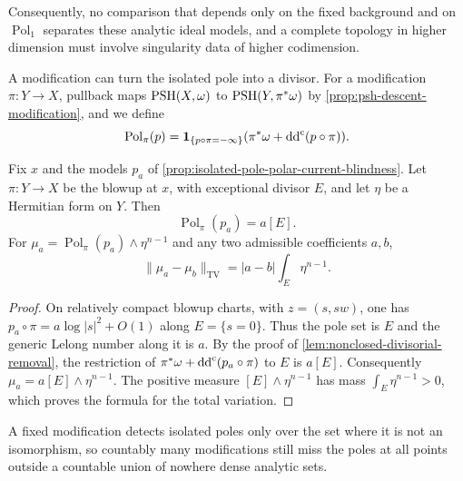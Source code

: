 Consequently, no comparison that depends only on the fixed background and on $\operatorname{Pol}_1$ separates these analytic ideal models, and a complete topology in higher dimension must involve singularity data of higher codimension.

A modification can turn the isolated pole into a divisor. For a modification $\pi\colon Y\to X$, pullback maps $\mathrm{PSH}(X,\omega)$ to $\mathrm{PSH}(Y,\pi^*\omega)$ by \cref{prop:psh-descent-modification}, and we define
\[
 \operatorname{Pol}_\pi(p)
 =\mathbf1_{\{p\circ\pi=-\infty\}}
       (\pi^*\omega+\mathrm{dd}^{\mathrm{c}}(p\circ\pi)).
\]

\begin{corollary}\label{cor:exceptional-polar-current-detects-pole}
Fix $x$ and the models $p_a$ of \cref{prop:isolated-pole-polar-current-blindness}. Let $\pi\colon Y\to X$ be the blowup at $x$, with exceptional divisor $E$, and let $\eta$ be a Hermitian form on $Y$. Then
\[
 \operatorname{Pol}_\pi(p_a)=a[E].
\]
For $\mu_a=\operatorname{Pol}_\pi(p_a)\wedge\eta^{n-1}$ and any two admissible coefficients $a,b$,
\[
 \|\mu_a-\mu_b\|_{\mathrm{TV}}
       =|a-b|\int_E\eta^{n-1}.
\]
\end{corollary}
\begin{proof}
On relatively compact blowup charts, with $z=(s,sw)$, one has $p_a\circ\pi=a\log|s|^2+O(1)$ along $E=\{s=0\}$. Thus the pole set is $E$ and the generic Lelong number along it is $a$. By the proof of \cref{lem:nonclosed-divisorial-removal}, the restriction of $\pi^*\omega+\mathrm{dd}^{\mathrm{c}}(p_a\circ\pi)$ to $E$ is $a[E]$. Consequently $\mu_a=a[E]\wedge\eta^{n-1}$. The positive measure $[E]\wedge\eta^{n-1}$ has mass $\int_E\eta^{n-1}>0$, which proves the formula for the total variation.
\end{proof}

A fixed modification detects isolated poles only over the set where it is not an isomorphism, so countably many modifications still miss the poles at all points outside a countable union of nowhere dense analytic sets.

